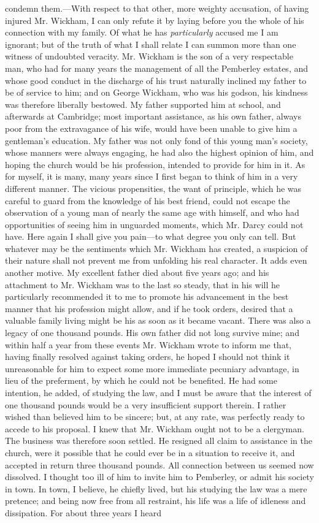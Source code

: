 condemn them.---With respect to that other, more weighty accusation, of having injured Mr. Wickham, I can only refute it by laying before you the whole of his connection with my family. Of what he has \textit{particularly} accused me I am ignorant; but of the truth of what I shall relate I can summon more than one witness of undoubted veracity. Mr. Wickham is the son of a very respectable man, who had for many years the management of all the Pemberley estates, and whose good conduct in the discharge of his trust naturally inclined my father to be of service to him; and on George Wickham, who was his godson, his kindness was therefore liberally bestowed. My father supported him at school, and afterwards at Cambridge; most important assistance, as his own father, always poor from the extravagance of his wife, would have been unable to give him a gentleman's education. My father was not only fond of this young man's society, whose manners were always engaging, he had also the highest opinion of him, and hoping the church would be his profession, intended to provide for him in it. As for myself, it is many, many years since I first began to think of him in a very different manner. The vicious propensities, the want of principle, which he was careful to guard from the knowledge of his best friend, could not escape the observation of a young man of nearly the same age with himself, and who had opportunities of seeing him in unguarded moments, which Mr. Darcy could not have. Here again I shall give you pain---to what degree you only can tell. But whatever may be the sentiments which Mr. Wickham has created, a suspicion of their nature shall not prevent me from unfolding his real character. It adds even another motive. My excellent father died about five years ago; and his attachment to Mr. Wickham was to the last so steady, that in his will he particularly recommended it to me to promote his advancement in the best manner that his profession might allow, and if he took orders, desired that a valuable family living might be his as soon as it became vacant. There was also a legacy of one thousand pounds. His own father did not long survive mine; and within half a year from these events Mr. Wickham wrote to inform me that, having finally resolved against taking orders, he hoped I should not think it unreasonable for him to expect some more immediate pecuniary advantage, in lieu of the preferment, by which he could not be benefited. He had some intention, he added, of studying the law, and I must be aware that the interest of one thousand pounds would be a very insufficient support therein. I rather wished than believed him to be sincere; but, at any rate, was perfectly ready to accede to his proposal. I knew that Mr. Wickham ought not to be a clergyman. The business was therefore soon settled. He resigned all claim to assistance in the church, were it possible that he could ever be in a situation to receive it, and accepted in return three thousand pounds. All connection between us seemed now dissolved. I thought too ill of him to invite him to Pemberley, or admit his society in town. In town, I believe, he chiefly lived, but his studying the law was a mere pretence; and being now free from all restraint, his life was a life of idleness and dissipation. For about three years I heard 